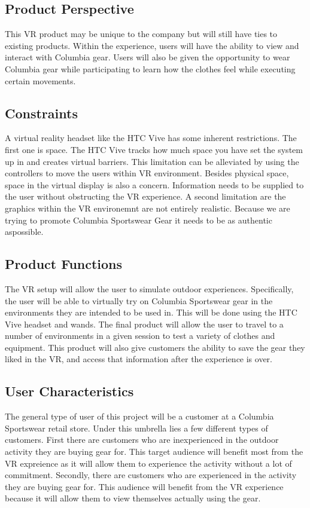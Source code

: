 \documentclass[10pt, oneside,onecolumn,draftclsnofoot]{IEEEtran}
\begin{document}
\subsection{Product Perspective}
This VR product may be unique to the company but will still have ties to
existing products. Within the experience, users will have the ability to view
and interact with Columbia gear. Users will also be given the opportunity to
wear Columbia gear while participating to learn how the clothes feel while
executing certain movements.

\subsection{Constraints}
A virtual reality headset like the HTC Vive has some inherent restrictions.
The first one is space. The HTC Vive tracks how much space you have set the
system up in and creates virtual barriers. This limitation can be alleviated by
using the controllers to move the users within VR environment. Besides physical space, space in the virtual display is also a concern. Information needs to be supplied to the user without obstructing the VR experience. A second
limitation are the graphics within the VR environemnt are not entirely realistic. Because we are trying to promote Columbia Sportswear Gear it needs to be as authentic aspossible.

\subsection{Product Functions}
The VR setup will allow the user to simulate outdoor experiences.
Specifically, the user will be able to virtually try on Columbia Sportswear
gear in the environments they are intended to be used in.
This will be done using the HTC Vive headset and wands. The final product
will allow the user to travel to a number of environments in a given session to
test a variety of clothes and equipment. This product will also give customers the ability to save the gear they liked in the VR, and access that information after the experience is over.

\subsection{User Characteristics}
The general type of user of this project will be a customer at a Columbia
Sportswear retail store. Under this umbrella lies a few different types of
customers. First there are customers who are inexperienced in the outdoor
activity they are buying gear for. This target audience will benefit most
from the VR expreience as it will allow them to experience the activity without a lot of commitment. Secondly, there are customers who are
experienced in the activity they are buying gear for. This audience will
benefit from the VR experience because it will allow them to view themselves
actually using the gear.
\end{document}
